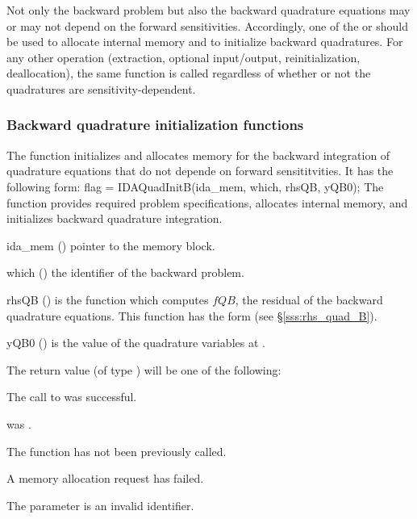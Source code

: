 Not only the backward problem but also the backward quadrature equations 
may or may not depend on the forward sensitivities. Accordingly, one of the 
 or  should be used to allocate internal 
memory and to initialize backward quadratures.  For any other operation
(extraction, optional input/output, reinitialization, deallocation), the
same function is called regardless of whether or not the quadratures are
sensitivity-dependent.

\subsubsection{Backward quadrature initialization functions}
\label{sss:idaquadinitb}

The function  initializes and allocates memory for the backward
integration of quadrature equations that do not depende on forward sensititvities.
It has the following form:
{
flag = IDAQuadInitB(ida\_mem, which, rhsQB, yQB0);
}
{
  The function  provides required problem specifications,
  allocates internal memory, and initializes backward quadrature integration.
}
{
  \begin{args}
  \item[ida\_mem] ()
    pointer to the {\idas} memory block.
  \item[which] ()
    the identifier of the backward problem.
  \item[rhsQB] ()
    is the {\C} function which computes $fQB$, the residual of the 
    backward quadrature equations. This function has the form 
    (see \S\ref{sss:rhs_quad_B}).
  \item[yQB0] ()
    is the value of the quadrature variables at .
  \end{args}
}
{
  The return value  (of type ) will be one of the following:
  \begin{args}
  \item[\Id{IDA\_SUCCESS}]
    The call to  was successful.
  \item[\Id{IDA\_MEM\_NULL}] 
     was .
  \item[\Id{IDA\_NO\_ADJ}]
    The function  has not been previously called.
  \item[\Id{IDA\_MEM\_FAIL}] 
    A memory allocation request has failed.
  \item[\Id{IDA\_ILL\_INPUT}]
    The parameter  is an invalid identifier.
  \end{args}
}
{}

